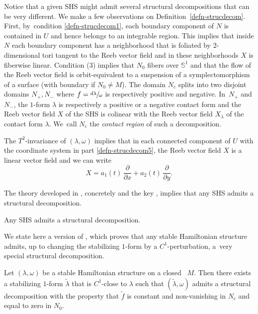 Notice that a given SHS might admit several structural decompositions that can be very different.
We make a few observations on Definition~\ref{defn-strucdecom}. First, by~condition \eqref{defn-strucdecom1}, each boundary component of $N$ is contained in $U$ and hence belongs to an integrable region. This implies that inside $N$ each boundary component has a neighborhood that is foliated by 2-dimensional tori tangent to the Reeb vector field and in these neighborhoods $X$ is fiberwise linear. Condition (3) implies that $N_0$ fibers over $\mathbb{S}^1$ and that the flow of the Reeb vector field is orbit-equivalent to a suspension of a symplectomorphism of a surface (with boundary if $N_0\neq M$). The domain $N_c$ splits into two disjoint domains $N_+, N_-$ where $f=\sfrac{d\lambda}{\omega}$ is respectively positive and negative. In~$N_+$ and $N_-$, the $1$-form $\lambda$ is respectively a positive or a negative contact form and the Reeb vector field $X$ of the SHS is colinear with the Reeb vector field $X_\lambda$ of the contact form $\lambda$. We~call $N_c$ the \emph{contact region} of such a decomposition.

The $T^2$-invariance of $(\lambda, \omega)$ implies that in each connected component of $U$ with the coordinate system in part \eqref{defn-strucdecom5},
the Reeb vector field $X$ is a linear vector field and we can write
\begin{equation}\label{eq-Xonregular}
X=a_1(t)\,\frac{\partial}{\partial x}+a_2(t)\,\frac{\partial}{\partial y}.
\end{equation}

The theory developed in \cite{CV1}, concretely \cite[Th.\,3.3]{CV1} and the key \cite[Prop.\,3.23]{CV1}, implies that any SHS admits a structural decomposition.
\begin{theorem}[\cite{CV1}]
Any SHS admits a structural decomposition.
\end{theorem}
We state here a version of \cite[Th.\,4.1]{CV1}, which proves that any stable Hamiltonian structure admits, up to changing the stabilizing $1$-form by a $C^1$-perturbation, a~very special structural decomposition.
\begin{theorem}\label{thm:struc}
Let $(\lambda,\omega)$ be a stable Hamiltonian structure on a closed \threemanifold~$M$. Then there exists a stabilizing $1$-form $\widetilde \lambda$ that is $C^1$-close to $\lambda$ such that $(\widetilde \lambda, \omega)$ admits a structural decomposition with the property that $\widetilde f$ is constant and non-vanishing in $N_c$ and equal to zero in $N_0$.
\end{theorem}

